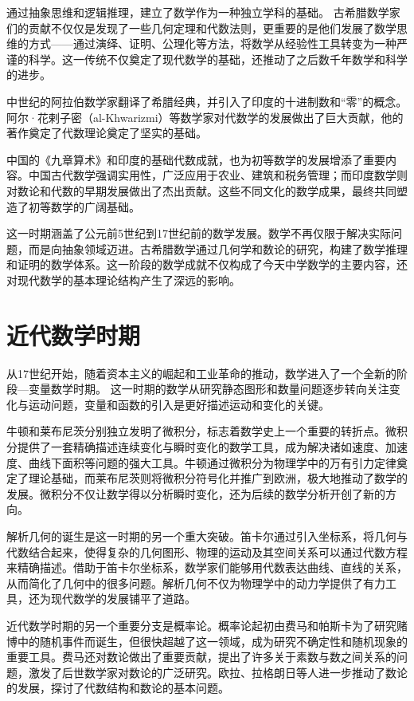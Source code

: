 通过抽象思维和逻辑推理，建立了数学作为一种独立学科的基础。
古希腊数学家们的贡献不仅仅是发现了一些几何定理和代数法则，更重要的是他们发展了数学思维的方式——通过演绎、证明、公理化等方法，将数学从经验性工具转变为一种严谨的科学。这一传统不仅奠定了现代数学的基础，还推动了之后数千年数学和科学的进步。

中世纪的阿拉伯数学家翻译了希腊经典，并引入了印度的十进制数和“零”的概念。阿尔·花剌子密（al-Khwarizmi）等数学家对代数学的发展做出了巨大贡献，他的著作奠定了代数理论奠定了坚实的基础。

中国的《九章算术》和印度的基础代数成就，也为初等数学的发展增添了重要内容。中国古代数学强调实用性，广泛应用于农业、建筑和税务管理；而印度数学则对数论和代数的早期发展做出了杰出贡献。这些不同文化的数学成果，最终共同塑造了初等数学的广阔基础。

这一时期涵盖了公元前5世纪到17世纪前的数学发展。数学不再仅限于解决实际问题，而是向抽象领域迈进。古希腊数学通过几何学和数论的研究，构建了数学推理和证明的数学体系。这一阶段的数学成就不仅构成了今天中学数学的主要内容，还对现代数学的基本理论结构产生了深远的影响。

\section{近代数学时期}
从17世纪开始，随着资本主义的崛起和工业革命的推动，数学进入了一个全新的阶段---变量数学时期。
这一时期的数学从研究静态图形和数量问题逐步转向关注变化与运动问题，变量和函数的引入是更好描述运动和变化的关键。

牛顿和莱布尼茨分别独立发明了微积分，标志着数学史上一个重要的转折点。微积分提供了一套精确描述连续变化与瞬时变化的数学工具，成为解决诸如速度、加速度、曲线下面积等问题的强大工具。牛顿通过微积分为物理学中的万有引力定律奠定了理论基础，而莱布尼茨则将微积分符号化并推广到欧洲，极大地推动了数学的发展。微积分不仅让数学得以分析瞬时变化，还为后续的数学分析开创了新的方向。

解析几何的诞生是这一时期的另一个重大突破。笛卡尔通过引入坐标系，将几何与代数结合起来，使得复杂的几何图形、物理的运动及其空间关系可以通过代数方程来精确描述。借助于笛卡尔坐标系，数学家们能够用代数表达曲线、直线的关系，从而简化了几何中的很多问题。解析几何不仅为物理学中的动力学提供了有力工具，还为现代数学的发展铺平了道路。

近代数学时期的另一个重要分支是概率论。概率论起初由费马和帕斯卡为了研究赌博中的随机事件而诞生，但很快超越了这一领域，成为研究不确定性和随机现象的重要工具。费马还对数论做出了重要贡献，提出了许多关于素数与数之间关系的问题，激发了后世数学家对数论的广泛研究。欧拉、拉格朗日等人进一步推动了数论的发展，探讨了代数结构和数论的基本问题。

